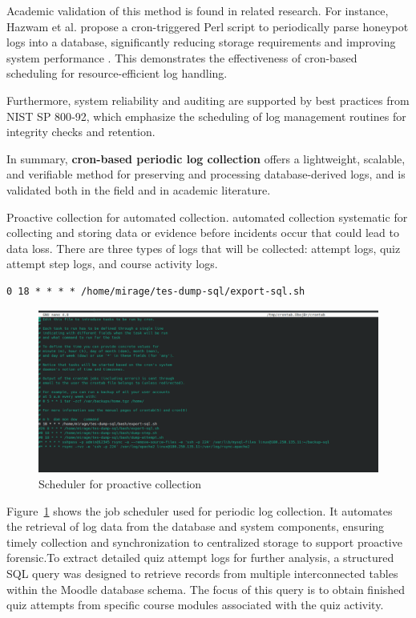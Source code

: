 Academic validation of this method is found in related research. For instance, Hazwam et al. propose a cron-triggered Perl script to periodically parse honeypot logs into a database, significantly reducing storage requirements and improving system performance \citet{halim2019honeypot}. This demonstrates the effectiveness of cron-based scheduling for resource-efficient log handling.

Furthermore, system reliability and auditing are supported by best practices from NIST SP 800‑92, which emphasize the scheduling of log management routines for integrity checks and retention.

In summary, \textbf{cron-based periodic log collection}  offers a lightweight, scalable, and verifiable method for preserving and processing database-derived logs, and is validated both in the field and in academic literature.

Proactive collection for automated collection. automated collection systematic for collecting and storing data or evidence before incidents occur that could lead to data loss. There are three types of logs that will be collected: attempt logs, quiz attempt step logs, and course activity logs.
\begin{verbatim}
0 18 * * * * /home/mirage/tes-dump-sql/export-sql.sh
\end{verbatim}
\begin{figure}[H] 
    \centering
    \includegraphics[width=14cm]{figure/scheduler-crontab.png}
    \caption{Scheduler for proactive collection}
    \label{fig:scheduler}
\end{figure}


Figure~\ref{fig:scheduler} shows the job scheduler used for periodic log collection. It automates the retrieval of log data from the database and system components, ensuring timely collection and synchronization to centralized storage to support proactive forensic.To extract detailed quiz attempt logs for further analysis, a structured SQL query was designed to retrieve records from multiple interconnected tables within the Moodle database schema. The focus of this query is to obtain finished quiz attempts from specific course modules associated with the quiz activity.

